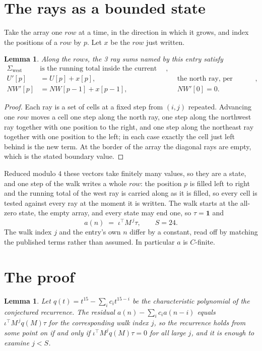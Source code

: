 \documentclass[11pt,a4paper]{article}
\theoremstyle{plain}
\newtheorem{lemma}[theorem]{Lemma}
\theoremstyle{definition}
\begin{document}
\section{The rays as a bounded state}

Take the array one $row$ at a time, in the direction in which it grows, and index the
positions of a $row $ by $p$. Let $x$ be the $row$ just written.

\begin{lemma}\label{lem:rays}
Along the $row$s, the 3 ray sums named by this entry satisfy
\[
\begin{aligned}
\Sigma_{\mathrm{west}}\ &\text{is the running total inside the current row},\\
U'[p]&=U[p]+x[p], &&\text{the north ray, per position},\\
NW'[p]&=NW[p-1]+x[p-1], && NW'[0]=0 .
\end{aligned}
\]
\end{lemma}

\begin{proof}
Each ray is a set of cells at a fixed step from $(i,j)$ repeated. Advancing one $row$
moves a cell one step along the north ray, one step along the northwest ray together with one
position to the right, and one step along the northeast ray together with one position to the
left; in each case exactly the cell just left behind is the new term. At the border of the
array the diagonal rays are empty, which is the stated boundary value.
\end{proof}

Reduced modulo $4$ these vectors take finitely many values, so they are a state, and one step
of the walk writes a whole $row$: the position $p$ is filled left to right and the
running total of the west ray is carried along as it is filled, so every cell is tested
against every ray at the moment it is written. The walk starts at the all-zero state, the empty
array, and every state may end one, so $\tau=\mathbf{1}$ and
\[
a(n)\;=\;\iota^{\!\top}M^{\,j}\tau ,\qquad S=24.
\]
The walk index $j$ and the entry's own $n$ differ by a constant, read off by matching the
published terms rather than assumed. In particular $a$ is $C$-finite.

\section{The proof}

\begin{lemma}\label{lem:crit}
Let $q(t)=t^{15}-\sum_i c_it^{15-i}$ be the characteristic polynomial of the
conjectured recurrence. The residual $a(n)-\sum_ic_ia(n-i)$ equals
$\iota^{\!\top}M^{\,j}q(M)\tau$ for the corresponding walk index $j$, so the recurrence
holds from some point on if and only if $\iota^{\!\top}M^{j}q(M)\tau=0$ for all large $j$,
and it is enough to examine $j<S$.
\end{lemma}
\end{document}
